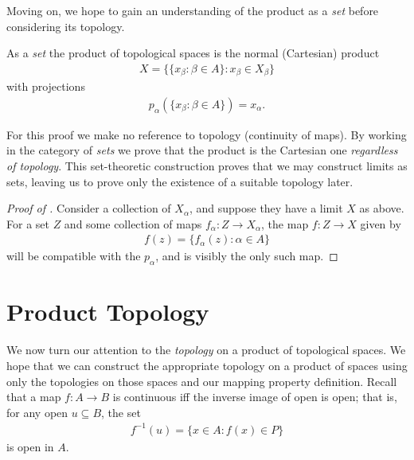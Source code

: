       Moving on, we hope to gain an understanding of the product as a \emph{set} before considering its topology.
      \begin{claim}
        \label{claim:prodiscart}
        As a \emph{set} the product of topological spaces is the normal (Cartesian) product
        \begin{align*}
          X = \{\{x_\beta:\beta\in A\}: x_\beta\in X_\beta\}
        \end{align*}
        with projections
        \begin{align*}
          p_\alpha(\{x_\beta:\beta\in A\}) = x_\alpha\text{.}
        \end{align*}
        \begin{rmk}
          For this proof we make no reference to topology (continuity of maps).
          By working in the category of \emph{sets} we prove that the product is the Cartesian one \emph{regardless of topology}.
          This set-theoretic construction proves that we may construct limits as sets, leaving us to prove only the existence of a suitable topology later.
        \end{rmk}
        \begin{proof}[Proof of ]
          Consider a collection of $X_\alpha$, and suppose they have a limit $X$ as above.
          For a set $Z$ and some collection of maps $f_\alpha:Z\rightarrow X_\alpha$, the map $f:Z\rightarrow X$ given by
          \begin{align*}
            f(z) = \{f_\alpha(z):\alpha\in A\}
          \end{align*}
          will be compatible with the $p_\alpha$, and is visibly the only such map.
        \end{proof}
      \end{claim}

    \section{Product Topology}
      We now turn our attention to the \emph{topology} on a product of topological spaces.
      We hope that we can construct the appropriate topology on a product of spaces using only the topologies on those spaces and our mapping property definition.
      Recall that a map $f:A\rightarrow B$ is continuous iff the inverse image of open is open; that is, for any open $u\subseteq B$, the set
      \begin{align*}
        f^{-1}(u) = \{x\in A:f(x)\in P\}
      \end{align*}
      is open in $A$.

